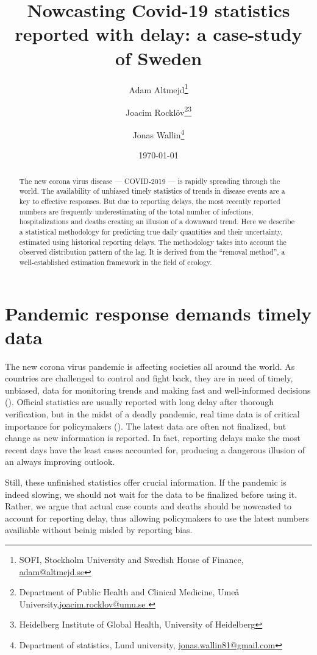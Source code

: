 \documentclass[a4paper,11pt,article,oneside,openany,american]{memoir}
\title{Nowcasting Covid-19 statistics reported with delay: a case-study of Sweden}
\date{\today}
\author{
	Adam Altmejd\thanks{SOFI, Stockholm University and Swedish House of Finance, \href{mailto:adam@altmejd.se}{adam@altmejd.se}} \and
	Joacim Rocklöv\thanks{Department of Public Health and Clinical Medicine, Umeå University,\href{mailto:joacim.rocklov@umu.se}{joacim.rocklov@umu.se }}\thanks{Heidelberg Institute of Global Health, University of Heidelberg}  \and
	Jonas Wallin\thanks{Department of statistics, Lund university, \href{mailto:jonas.wallin81@gmail.com}{jonas.wallin81@gmail.com}}
}
\begin{document}
\frontmatter%
\begin{titlingpage}
    \maketitle
    \begin{abstract}
        The new corona virus disease --- COVID-2019 --- is rapidly spreading through the world. The availability of unbiased timely statistics of trends in disease events are a key to effective responses. But due to reporting delays, the most recently reported numbers are frequently underestimating of the total number of infections, hospitalizations and deaths creating an illusion of a downward trend. Here we describe a statistical methodology for predicting true daily quantities and their uncertainty, estimated using historical reporting delays. The methodology takes into account the observed distribution pattern of the lag. It is derived from the ``removal method'', a well-established estimation framework in the field of ecology.
	\end{abstract}


\end{titlingpage}
\mainmatter%

\chapter{Pandemic response demands timely data}
The new corona virus pandemic is affecting societies all around the world. As countries are challenged to control and fight back, they are in need of timely, unbiased, data for monitoring trends and making fast and well-informed decisions (\cite{No_author_2020_coronavirus_three}). Official statistics are usually reported with long delay after thorough verification, but in the midst of a deadly pandemic, real time data is of critical importance for policymakers (\cite{Jajosky2004_evaluation_reporting}). The latest data are often not finalized, but change as new information is reported. In fact, reporting delays make the most recent days have the least cases accounted for, producing a dangerous illusion of an always improving outlook.

Still, these unfinished statistics offer crucial information. If the pandemic is indeed slowing, we should not wait for the data to be finalized before using it. Rather, we argue that actual case counts and deaths should be nowcasted to account for reporting delay, thus allowing policymakers to use the latest numbers availiable without beinig misled by reporting bias.
\end{document}
